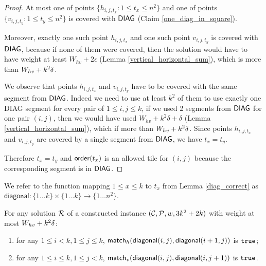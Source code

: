 \begin{proof}
At most one of points $\{h_{i,j,t_x} : 1 \le t_x \le n^2\}$
and one of points $\{v_{i,j,t_y} : 1 \le t_y \le n^2\}$
is covered with $\mathsf{DIAG}$
(Claim \ref{one_diag_in_square}).
	
Moreover, exactly one such point $h_{i,j,t_x}$ and one such point $v_{i,j,t_y}$
is covered with $\mathsf{DIAG}$,
because if none of them were covered, then the solution would have to
have weight at least $W_{hv} + 2\epsilon$ (Lemma \ref{vertical_horizontal_sum}),
which is more than $W_{hv} +k^2\delta$.

We observe that points $h_{i,j,t_x}$ and $v_{i,j,t_y}$
have to be covered with the same segment from $\mathsf{DIAG}$.
Indeed we need to use at least $k^2$ of them to use
exactly one DIAG segment for every pair of $1 \le i,j \le k$,
if we used 2 segments from $\mathsf{DIAG}$
for one pair $(i,j)$,
then we would have used $W_{hv} + k^2\delta + \delta$ (Lemma \ref{vertical_horizontal_sum}),
which if more than $W_{hv} +k^2\delta$.
Since points $h_{i,j,t_x}$ and $v_{i,j,t_y}$ are covered by
a single segment from $\mathsf{DIAG}$, we have $t_x = t_y$.

Therefore $t_x = t_y$
and $\mathsf{order}(t_x)$ is an allowed tile for $(i,j)$
because the corresponding segment is in $\mathsf{DIAG}$.
\end{proof}

\newcommand{\diagonal}{\mathsf{diagonal}}
We refer to the function mapping $1 \le x \le k$ to $t_x$ from Lemma \ref{diag_correct}
as $\diagonal : \{1 \ldots k\} \times \{1 \ldots k\} \rightarrow \{1 \ldots n^2\}$.

\begin{lemma}
\label{vertical_horizontal_synchronized}
For any solution $\mathcal{R}$
of a constructed instance $(\mathcal{C}, \mathcal{P}, w, 3k^2+2k)$
with weight at most $W_{hv} +k^2\delta$:
\begin{enumerate}
\item 
for any $1 \le i < k, 1 \le j \le k$,
$\matchh(\diagonal(i, j),\diagonal(i+1, j))$ is $\texttt{true}$;
\item 
for any $1 \le i \le k, 1 \le j < k$,
$\matchv(\diagonal(i, j),\diagonal(i, j+1))$ is $\texttt{true}$.
\end{enumerate}
\end{lemma}

